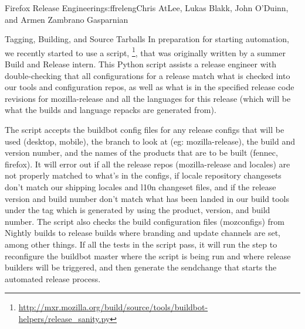\begin{aosachapter}{Firefox Release Engineering}{s:ffreleng}{Chris AtLee, Lukas Blakk, John O'Duinn, and Armen Zambrano Gasparnian}
\begin{aosasect1}{Tagging, Building, and Source Tarballs}
In preparation for starting automation, we recently started to use a
script,
\footnote{\url{http://mxr.mozilla.org/build/source/tools/buildbot-helpers/release_sanity.py}}, 
that was originally written by a summer Build and Release intern. This
Python script assists a release engineer with double-checking that
all configurations for a release match what is checked into our tools
and configuration repos, as well as what is in the specified release
code revisions for mozilla-release and all the languages for this
release (which will be what the builds and language repacks are
generated from).



The script accepts the buildbot config files for any release configs
that will be used (desktop, mobile), the branch to look at (eg:
mozilla-release), the build and version number, and the names of the
products that are to be built (fennec, firefox). It will error out if
all the release repos (mozilla-release and locales) are not properly
matched to what's in the configs, if locale repository changesets don't
match our shipping locales and l10n changeset files, and if the
release version and build number don't match what has been landed in
our build tools under the tag which is generated by using the product,
version, and build number. The script also checks the build
configuration files (mozconfigs) from Nightly builds to release builds
where branding and update channels are set, among other things. If all
the tests in the script pass, it will run the step to reconfigure the
buildbot master where the script is being run and where release
builders will be triggered, and then generate the sendchange that
starts the automated release process.


\end{aosasect1}
\end{aosachapter}
